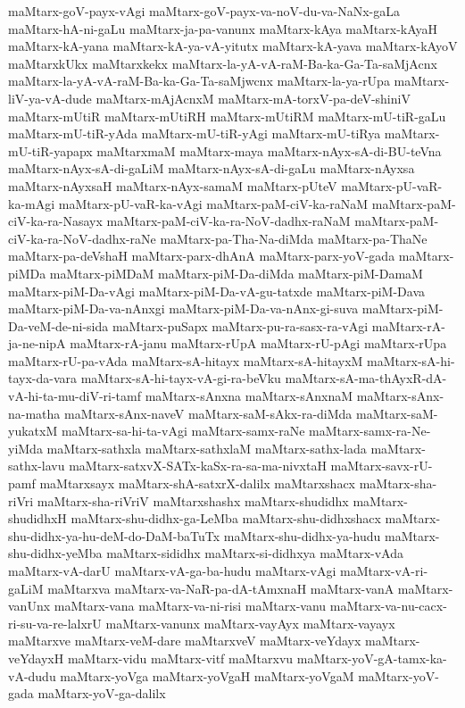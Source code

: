 {maMtarx-goV-payx-vAgi
maMtarx-goV-payx-va-noV-du-va-NaNx-gaLa
maMtarx-hA-ni-gaLu
maMtarx-ja-pa-vanunx
maMtarx-kAya
maMtarx-kAyaH
maMtarx-kA-yana
maMtarx-kA-ya-vA-yitutx
maMtarx-kA-yava
maMtarx-kAyoV
maMtarxkUkx
maMtarxkekx
maMtarx-la-yA-vA-raM-Ba-ka-Ga-Ta-saMjAcnx
maMtarx-la-yA-vA-raM-Ba-ka-Ga-Ta-saMjwcnx
maMtarx-la-ya-rUpa
maMtarx-liV-ya-vA-dude
maMtarx-mAjAcnxM
maMtarx-mA-torxV-pa-deV-shiniV
maMtarx-mUtiR
maMtarx-mUtiRH
maMtarx-mUtiRM
maMtarx-mU-tiR-gaLu
maMtarx-mU-tiR-yAda
maMtarx-mU-tiR-yAgi
maMtarx-mU-tiRya
maMtarx-mU-tiR-yapapx
maMtarxmaM
maMtarx-maya
maMtarx-nAyx-sA-di-BU-teVna
maMtarx-nAyx-sA-di-gaLiM
maMtarx-nAyx-sA-di-gaLu
maMtarx-nAyxsa
maMtarx-nAyxsaH
maMtarx-nAyx-samaM
maMtarx-pUteV
maMtarx-pU-vaR-ka-mAgi
maMtarx-pU-vaR-ka-vAgi
maMtarx-paM-ciV-ka-raNaM
maMtarx-paM-ciV-ka-ra-Nasayx
maMtarx-paM-ciV-ka-ra-NoV-dadhx-raNaM
maMtarx-paM-ciV-ka-ra-NoV-dadhx-raNe
maMtarx-pa-Tha-Na-diMda
maMtarx-pa-ThaNe
maMtarx-pa-deVshaH
maMtarx-parx-dhAnA
maMtarx-parx-yoV-gada
maMtarx-piMDa
maMtarx-piMDaM
maMtarx-piM-Da-diMda
maMtarx-piM-DamaM
maMtarx-piM-Da-vAgi
maMtarx-piM-Da-vA-gu-tatxde
maMtarx-piM-Dava
maMtarx-piM-Da-va-nAnxgi
maMtarx-piM-Da-va-nAnx-gi-suva
maMtarx-piM-Da-veM-de-ni-sida
maMtarx-puSapx
maMtarx-pu-ra-sasx-ra-vAgi
maMtarx-rA-ja-ne-nipA
maMtarx-rA-janu
maMtarx-rUpA
maMtarx-rU-pAgi
maMtarx-rUpa
maMtarx-rU-pa-vAda
maMtarx-sA-hitayx
maMtarx-sA-hitayxM
maMtarx-sA-hi-tayx-da-vara
maMtarx-sA-hi-tayx-vA-gi-ra-beVku
maMtarx-sA-ma-thAyxR-dA-vA-hi-ta-mu-diV-ri-tamf
maMtarx-sAnxna
maMtarx-sAnxnaM
maMtarx-sAnx-na-matha
maMtarx-sAnx-naveV
maMtarx-saM-sAkx-ra-diMda
maMtarx-saM-yukatxM
maMtarx-sa-hi-ta-vAgi
maMtarx-samx-raNe
maMtarx-samx-ra-Ne-yiMda
maMtarx-sathxla
maMtarx-sathxlaM
maMtarx-sathx-lada
maMtarx-sathx-lavu
maMtarx-satxvX-SATx-kaSx-ra-sa-ma-nivxtaH
maMtarx-savx-rU-pamf
maMtarxsayx
maMtarx-shA-satxrX-dalilx
maMtarxshacx
maMtarx-sha-riVri
maMtarx-sha-riVriV
maMtarxshashx
maMtarx-shudidhx
maMtarx-shudidhxH
maMtarx-shu-didhx-ga-LeMba
maMtarx-shu-didhxshacx
maMtarx-shu-didhx-ya-hu-deM-do-DaM-baTuTx
maMtarx-shu-didhx-ya-hudu
maMtarx-shu-didhx-yeMba
maMtarx-sididhx
maMtarx-si-didhxya
maMtarx-vAda
maMtarx-vA-darU
maMtarx-vA-ga-ba-hudu
maMtarx-vAgi
maMtarx-vA-ri-gaLiM
maMtarxva
maMtarx-va-NaR-pa-dA-tAmxnaH
maMtarx-vanA
maMtarx-vanUnx
maMtarx-vana
maMtarx-va-ni-risi
maMtarx-vanu
maMtarx-va-nu-cacx-ri-su-va-re-lalxrU
maMtarx-vanunx
maMtarx-vayAyx
maMtarx-vayayx
maMtarxve
maMtarx-veM-dare
maMtarxveV
maMtarx-veYdayx
maMtarx-veYdayxH
maMtarx-vidu
maMtarx-vitf
maMtarxvu
maMtarx-yoV-gA-tamx-ka-vA-dudu
maMtarx-yoVga
maMtarx-yoVgaH
maMtarx-yoVgaM
maMtarx-yoV-gada
maMtarx-yoV-ga-dalilx
}
